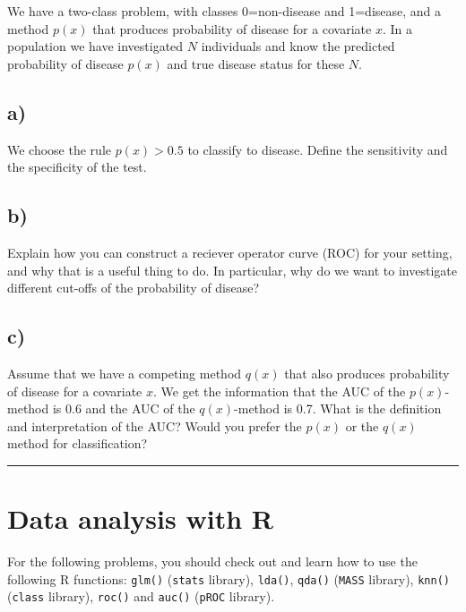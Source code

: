 \documentclass[
]{article}
\begin{document}
We have a two-class problem, with classes 0=non-disease and 1=disease,
and a method \(p(x)\) that produces probability of disease for a
covariate \(x\). In a population we have investigated \(N\) individuals
and know the predicted probability of disease \(p(x)\) and true disease
status for these \(N\).

\hypertarget{a-4}{%
\subsection{a)}\label{a-4}}

We choose the rule \(p(x)>0.5\) to classify to disease. Define the
sensitivity and the specificity of the test.

\hypertarget{b-4}{%
\subsection{b)}\label{b-4}}

Explain how you can construct a reciever operator curve (ROC) for your
setting, and why that is a useful thing to do. In particular, why do we
want to investigate different cut-offs of the probability of disease?

\hypertarget{c-2}{%
\subsection{c)}\label{c-2}}

Assume that we have a competing method \(q(x)\) that also produces
probability of disease for a covariate \(x\). We get the information
that the AUC of the \(p(x)\)-method is 0.6 and the AUC of the
\(q(x)\)-method is 0.7. What is the definition and interpretation of the
AUC? Would you prefer the \(p(x)\) or the \(q(x)\) method for
classification?

\begin{center}\rule{0.5\linewidth}{0.5pt}\end{center}

\hypertarget{data-analysis-with-r}{%
\section{Data analysis with R}\label{data-analysis-with-r}}

For the following problems, you should check out and learn how to use
the following R functions: \texttt{glm()} (\texttt{stats} library),
\texttt{lda()}, \texttt{qda()} (\texttt{MASS} library), \texttt{knn()}
(\texttt{class} library), \texttt{roc()} and \texttt{auc()}
(\texttt{pROC} library).
\end{document}
